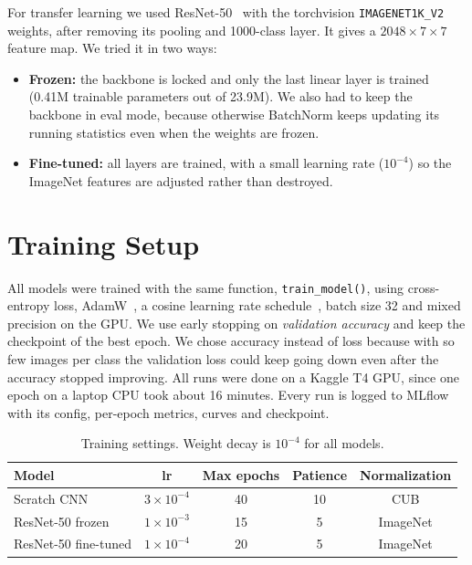 \documentclass[11pt,a4paper]{article}
\newcommand{\code}[1]{\texttt{\small #1}}
\begin{document}
For transfer learning we used ResNet-50~\cite{he2016resnet} with the torchvision \code{IMAGENET1K\_V2} weights, after removing its pooling and 1000-class layer. It gives a $2048\times7\times7$ feature map. We tried it in two ways:
\begin{itemize}
  \item \textbf{Frozen:} the backbone is locked and only the last linear layer is trained (0.41M trainable parameters out of 23.9M). We also had to keep the backbone in eval mode, because otherwise BatchNorm keeps updating its running statistics even when the weights are frozen.
  \item \textbf{Fine-tuned:} all layers are trained, with a small learning rate ($10^{-4}$) so the ImageNet features are adjusted rather than destroyed.
\end{itemize}

\section{Training Setup}

All models were trained with the same function, \code{train\_model()}, using cross-entropy loss, AdamW~\cite{loshchilov2019adamw}, a cosine learning rate schedule~\cite{loshchilov2017sgdr}, batch size 32 and mixed precision on the GPU. We use early stopping on \emph{validation accuracy} and keep the checkpoint of the best epoch. We chose accuracy instead of loss because with so few images per class the validation loss could keep going down even after the accuracy stopped improving. All runs were done on a Kaggle T4 GPU, since one epoch on a laptop CPU took about 16 minutes. Every run is logged to MLflow with its config, per-epoch metrics, curves and checkpoint.

\begin{table}[H]
\centering
\small
\begin{tabular}{l c c c c}
\toprule
\textbf{Model} & \textbf{lr} & \textbf{Max epochs} & \textbf{Patience} & \textbf{Normalization} \\
\midrule
Scratch CNN        & $3\times10^{-4}$ & 40 & 10 & CUB \\
ResNet-50 frozen   & $1\times10^{-3}$ & 15 & 5  & ImageNet \\
ResNet-50 fine-tuned & $1\times10^{-4}$ & 20 & 5  & ImageNet \\
\bottomrule
\end{tabular}
\caption{Training settings. Weight decay is $10^{-4}$ for all models.}
\label{tab:settings}
\end{table}
\end{document}
